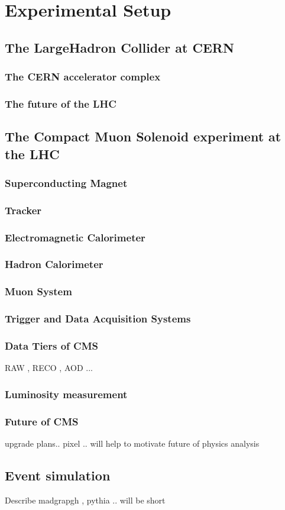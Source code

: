 \chapter{Experimental Setup}
\section{The LargeHadron Collider at CERN}
\newpage
\subsection{The CERN accelerator complex}
\newpage
\subsection{The future of the LHC}
\newpage
\section{The Compact Muon Solenoid experiment at the LHC}
\newpage
\subsection{Superconducting Magnet}
\newpage
\subsection{Tracker}
\newpage
\subsection{Electromagnetic Calorimeter}
\newpage
\subsection{Hadron Calorimeter}
\newpage
\subsection{Muon System}
\newpage
\subsection{Trigger and Data Acquisition Systems }
\newpage
\subsection{Data Tiers of CMS}
RAW , RECO , AOD ...
\newpage
\subsection{Luminosity measurement}
\newpage
\subsection{Future of CMS}
upgrade plans.. pixel .. will help to motivate future of physics analysis
\newpage
\section{Event simulation}
Describe madgrapgh , pythia .. will be short 
